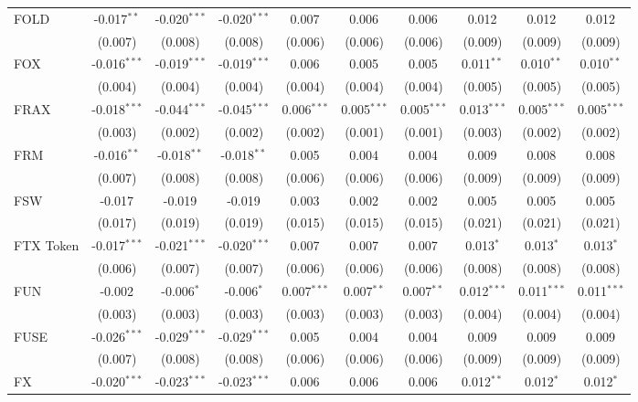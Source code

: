 \begin{table}[!htbp]
\begin{tabular}{@{\extracolsep{5pt}}lccccccccc}
 FOLD & -0.017$^{**}$ & -0.020$^{***}$ & -0.020$^{***}$ & 0.007$^{}$ & 0.006$^{}$ & 0.006$^{}$ & 0.012$^{}$ & 0.012$^{}$ & 0.012$^{}$ \\
  & (0.007) & (0.008) & (0.008) & (0.006) & (0.006) & (0.006) & (0.009) & (0.009) & (0.009) \\
 FOX & -0.016$^{***}$ & -0.019$^{***}$ & -0.019$^{***}$ & 0.006$^{}$ & 0.005$^{}$ & 0.005$^{}$ & 0.011$^{**}$ & 0.010$^{**}$ & 0.010$^{**}$ \\
  & (0.004) & (0.004) & (0.004) & (0.004) & (0.004) & (0.004) & (0.005) & (0.005) & (0.005) \\
 FRAX & -0.018$^{***}$ & -0.044$^{***}$ & -0.045$^{***}$ & 0.006$^{***}$ & 0.005$^{***}$ & 0.005$^{***}$ & 0.013$^{***}$ & 0.005$^{***}$ & 0.005$^{***}$ \\
  & (0.003) & (0.002) & (0.002) & (0.002) & (0.001) & (0.001) & (0.003) & (0.002) & (0.002) \\
 FRM & -0.016$^{**}$ & -0.018$^{**}$ & -0.018$^{**}$ & 0.005$^{}$ & 0.004$^{}$ & 0.004$^{}$ & 0.009$^{}$ & 0.008$^{}$ & 0.008$^{}$ \\
  & (0.007) & (0.008) & (0.008) & (0.006) & (0.006) & (0.006) & (0.009) & (0.009) & (0.009) \\
 FSW & -0.017$^{}$ & -0.019$^{}$ & -0.019$^{}$ & 0.003$^{}$ & 0.002$^{}$ & 0.002$^{}$ & 0.005$^{}$ & 0.005$^{}$ & 0.005$^{}$ \\
  & (0.017) & (0.019) & (0.019) & (0.015) & (0.015) & (0.015) & (0.021) & (0.021) & (0.021) \\
 FTX Token & -0.017$^{***}$ & -0.021$^{***}$ & -0.020$^{***}$ & 0.007$^{}$ & 0.007$^{}$ & 0.007$^{}$ & 0.013$^{*}$ & 0.013$^{*}$ & 0.013$^{*}$ \\
  & (0.006) & (0.007) & (0.007) & (0.006) & (0.006) & (0.006) & (0.008) & (0.008) & (0.008) \\
 FUN & -0.002$^{}$ & -0.006$^{*}$ & -0.006$^{*}$ & 0.007$^{***}$ & 0.007$^{**}$ & 0.007$^{**}$ & 0.012$^{***}$ & 0.011$^{***}$ & 0.011$^{***}$ \\
  & (0.003) & (0.003) & (0.003) & (0.003) & (0.003) & (0.003) & (0.004) & (0.004) & (0.004) \\
 FUSE & -0.026$^{***}$ & -0.029$^{***}$ & -0.029$^{***}$ & 0.005$^{}$ & 0.004$^{}$ & 0.004$^{}$ & 0.009$^{}$ & 0.009$^{}$ & 0.009$^{}$ \\
  & (0.007) & (0.008) & (0.008) & (0.006) & (0.006) & (0.006) & (0.009) & (0.009) & (0.009) \\
 FX & -0.020$^{***}$ & -0.023$^{***}$ & -0.023$^{***}$ & 0.006$^{}$ & 0.006$^{}$ & 0.006$^{}$ & 0.012$^{**}$ & 0.012$^{*}$ & 0.012$^{*}$ \\

\end{tabular}
\end{table}
